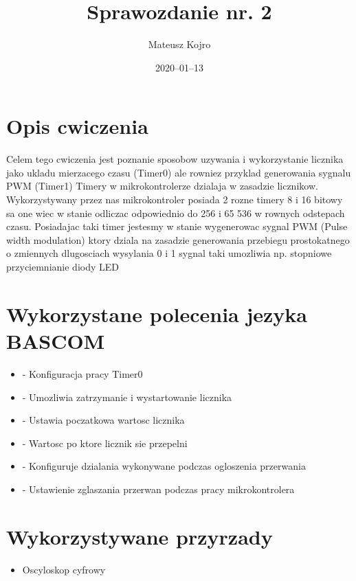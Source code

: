 \documentclass{article}
\title{Sprawozdanie nr. 2}
\author{Mateusz Kojro}
\date{2020–01–13}
\begin{document}
\maketitle

\section{Opis cwiczenia}

Celem tego cwiczenia jest poznanie sposobow uzywania i wykorzystanie licznika jako
ukladu mierzacego czasu (Timer0) ale rowniez przyklad generowania sygnalu PWM (Timer1)
Timery w mikrokontrolerze dzialaja w zasadzie licznikow. Wykorzystywany przez nas mikrokontroler
posiada 2 rozne timery 8 i 16 bitowy sa one wiec w stanie odliczac odpowiednio do
256 i 65 536 w rownych odstepach czasu. Posiadajac taki timer jestesmy w stanie
wygenerowac sygnal PWM (Pulse width modulation) ktory dziala na zasadzie 
generowania przebiegu prostokatnego o zmiennych dlugosciach wysylania 0 i 1
sygnal taki umozliwia np. stopniowe przyciemnianie diody LED

\section{Wykorzystane polecenia jezyka BASCOM}
\begin{itemize}
  \item {} - Konfiguracja pracy Timer0
  \item {} - Umozliwia zatrzymanie i wystartowanie licznika
  \item {} - Ustawia poczatkowa wartosc licznika
  \item {} - Wartosc po ktore licznik sie przepelni
  \item {} - Konfiguruje dzialania wykonywane podczas ogloszenia przerwania
  \item {} - Ustawienie zglaszania przerwan podczas pracy mikrokontrolera
\end{itemize}

\section{Wykorzystywane przyrzady}
\begin{itemize}
  \item Oscyloskop cyfrowy
\end{itemize}
\end{document}

